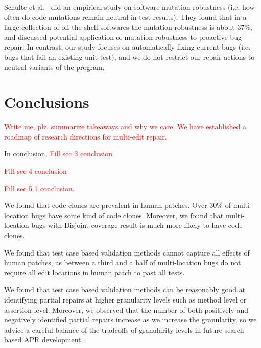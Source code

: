 \documentclass[sigconf, timestamp-false, anonymous=true]{acmart}
\newcommand\todo[1]{\textcolor{red}{#1}}
\begin{document}
Schulte et al.~\cite{schulte} did an empirical study on software mutation robustness 
(i.e. how often do code mutations remain neutral in test results). 
They found that in a large collection of off-the-shelf softwares the mutation robustness is about 37\%, 
and discussed potential application of mutation robustness to proactive bug repair. 
In contrast, our study focuses on automatically fixing current bugs (i.e. bugs that fail an existing unit test), 
and we do not restrict our repair actions to neutral variants of the program.

\section{Conclusions}
\label{sec:conclusions}

\todo{Write me, plz, summarize takeaways and why we care.  We have established a
  roadmap of research directions for multi-edit repair.}

In conclusion, \todo{Fill sec 3 conclusion}

\todo{Fill sec 4 conclusion}

\todo{Fill sec 5.1 conclusion}.

We found that code clones are prevalent in human patches. Over 30\%
of multi-location bugs have some kind of code clones. Moreover, we found that multi-location bugs with Disjoint
coverage result is much more likely to have code clones.

We found that test case based validation methods cannot capture all effects of human patches,
as between a third and a half of multi-location bugs do not require all edit locations in human patch to
past all tests.

We found that test case based validation methods can be reasonably good at identifying partial
repairs at higher granularity levels such as method level or assertion level. Moreover, 
we observed that the number of both positively and negatively identified partial repairs
increase as we increase the granularity, so we advice a careful balance of the tradeoffs of
granularity levels in future search based APR development.



\end{document}
